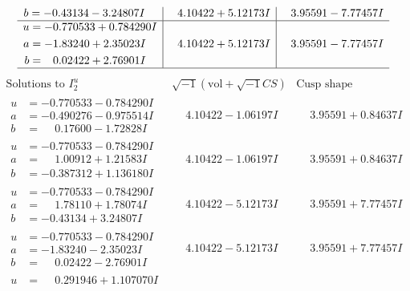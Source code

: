 \documentclass[1p]{elsarticle_modified}
\theoremstyle{definition}
\newcommand{\I}{\sqrt{-1}}
\begin{document}
$$\begin{array}{c|c|c}
\begin{aligned}
b &= -0.43134 - 3.24807 I\end{aligned}
 & \phantom{-}4.10422 + 5.12173 I & \phantom{-}3.95591 - 7.77457 I \\ \hline\begin{aligned}
u &= -0.770533 + 0.784290 I \\
a &= -1.83240 + 2.35023 I \\
b &= \phantom{-}0.02422 + 2.76901 I\end{aligned}
 & \phantom{-}4.10422 + 5.12173 I & \phantom{-}3.95591 - 7.77457 I\\
 \hline 
 \end{array}$$\newpage$$\begin{array}{c|c|c}  
\text{Solutions to }I^u_{2}& \I (\text{vol} + \sqrt{-1}CS) & \text{Cusp shape}\\
 \hline 
\begin{aligned}
u &= -0.770533 - 0.784290 I \\
a &= -0.490276 - 0.975514 I \\
b &= \phantom{-}0.17600 - 1.72828 I\end{aligned}
 & \phantom{-}4.10422 - 1.06197 I & \phantom{-}3.95591 + 0.84637 I \\ \hline\begin{aligned}
u &= -0.770533 - 0.784290 I \\
a &= \phantom{-}1.00912 + 1.21583 I \\
b &= -0.387312 + 1.136180 I\end{aligned}
 & \phantom{-}4.10422 - 1.06197 I & \phantom{-}3.95591 + 0.84637 I \\ \hline\begin{aligned}
u &= -0.770533 - 0.784290 I \\
a &= \phantom{-}1.78110 + 1.78074 I \\
b &= -0.43134 + 3.24807 I\end{aligned}
 & \phantom{-}4.10422 - 5.12173 I & \phantom{-}3.95591 + 7.77457 I \\ \hline\begin{aligned}
u &= -0.770533 - 0.784290 I \\
a &= -1.83240 - 2.35023 I \\
b &= \phantom{-}0.02422 - 2.76901 I\end{aligned}
 & \phantom{-}4.10422 - 5.12173 I & \phantom{-}3.95591 + 7.77457 I \\ \hline\begin{aligned}
u &= \phantom{-}0.291946 + 1.107070 I \\

\end{aligned}
\end{array}$$
\end{document}
